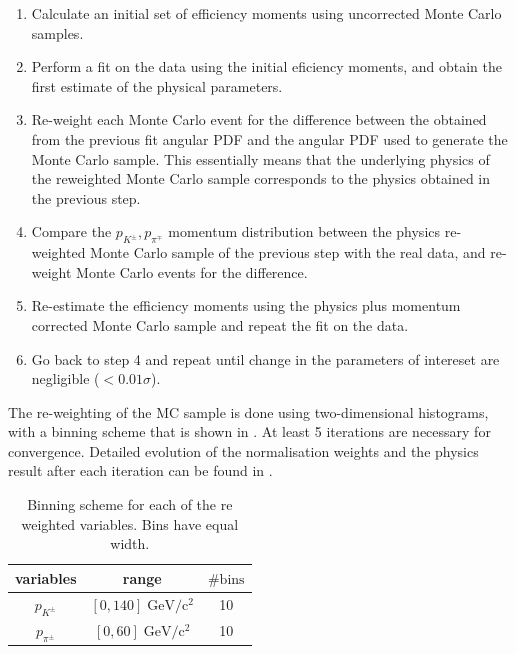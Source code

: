 \begin{enumerate}
\item Calculate an initial set of efficiency moments using uncorrected \BdJpsiKst Monte Carlo samples.
\item Perform a fit on the \BsJpsiKst data using the initial eficiency moments, and obtain the first estimate of the physical parameters.
\item Re-weight each Monte Carlo event for the difference between the obtained from the previous fit angular PDF and the angular PDF used to generate the Monte Carlo sample. 
      This essentially means that the underlying physics of the reweighted Monte Carlo sample corresponds to the physics obtained in the previous step.
\item Compare the $p_{K^{\pm}},p_{\pi^{\mp}}$ momentum distribution between the physics re-weighted Monte Carlo sample of the previous step with the 
      real data, and re-weight Monte Carlo events for the difference.
\item Re-estimate the efficiency moments using the physics plus momentum corrected \BdJpsiKst Monte Carlo sample and repeat the fit on the \BsJpsiKst data.
\item Go back to step 4 and repeat until change in the parameters of intereset are negligible ($<0.01\sigma$).
\end{enumerate} 


The re-weighting of the MC sample is done using two-dimensional histograms, with a binning scheme that is shown in . 
At least 5 iterations are necessary for convergence. Detailed evolution of the normalisation weights and the physics result after each iteration
can be found in \appref{}. 

\begin{table}[!h]
  \center
  \caption{\small Binning scheme for each of the re weighted variables. Bins have equal width.}
  \begin{tabular}{c c c}
    
     variables & range & $\# \text{bins}$ \\
    \hline
    $p_{K^{\pm}}$    &  $[0,140]    \;  \text{GeV}/\text{c}^2$  & 10      \\ 
    $p_{\pi^{\pm}}$  &  $[0,60]      \;  \text{GeV}/\text{c}^2$  & 10      \\ 
    \hline
  \end{tabular}
  \label{angAccBinning}
\end{table}


